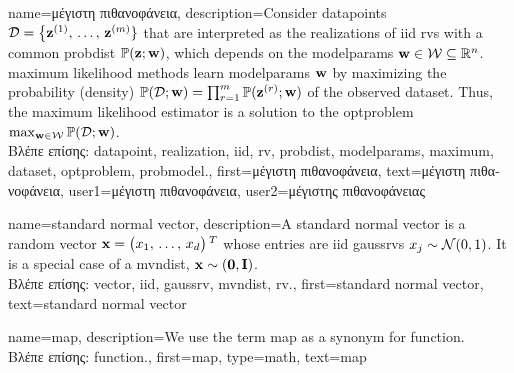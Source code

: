 {name={\foreignlanguage{greek}{μέγιστη πιθανοφάνεια}}, 
	description={Consider \gls{datapoint}s $\mathcal{D}=\big\{ {\bf z}^{(1)}, \,\ldots, \,{\bf z}^{(m)} \}$ 
		that are interpreted as the \gls{realization}s of \gls{iid} \gls{rv}s with a common \gls{probdist} $\mathbb{P}({{\bf z}; {\bf w}})$, which 
		depends on the \gls{modelparams} ${\bf w} \in \mathcal{W} \subseteq \mathbb{R}^{n}$. 
		\Gls{maximum} likelihood methods learn \gls{modelparams} ${\bf w}$ by maximizing 
		the probability (density) $\mathbb{P}({\mathcal{D}; {\bf w}}) = \prod_{r=1}^{m} \mathbb{P}({{\bf z}^{(r)}; {\bf w}})$ 
		of the observed \gls{dataset}. Thus, the \gls{maximum} likelihood estimator is a 
		solution to the \gls{optproblem} $\max_{{\bf w} \in \mathcal{W}} \mathbb{P}({\mathcal{D}; {\bf w}})$.\\
		\foreignlanguage{greek}{Βλέπε επίσης:} \gls{datapoint}, \gls{realization}, \gls{iid}, \gls{rv}, \gls{probdist}, \gls{modelparams}, \gls{maximum}, 
		\gls{dataset}, \gls{optproblem}, \gls{probmodel}.},
	first={\foreignlanguage{greek}{μέγιστη πιθανοφάνεια}},
	text={\foreignlanguage{greek}{μέγιστη πιθανοφάνεια}},
	user1={\foreignlanguage{greek}{μέγιστη πιθανοφάνεια}}, %
  	user2={\foreignlanguage{greek}{μέγιστης πιθανοφά\-νει\-ας}} %
}

{name={standard normal vector}, 
	description={A standard normal \gls{vector} is a random \gls{vector} ${\bf x}=\big(x_{1}, \,\ldots, \,x_{d}\big)\,^{T}$ 
		whose entries are \gls{iid} \gls{gaussrv}s $x_{j} \sim \mathcal{N}(0,1)$. 
		It is a special case of a \gls{mvndist}, ${\bf x} \sim \mathcal(\mathbf{0},\mathbf{I})$. \\ 
		\foreignlanguage{greek}{Βλέπε επίσης:} \gls{vector}, \gls{iid}, \gls{gaussrv}, \gls{mvndist}, \gls{rv}.}, 
	first={standard normal vector},
	text={standard normal vector}
}

{name={map},
	description={We use the term map as a synonym for \gls{function}. \\
		\foreignlanguage{greek}{Βλέπε επίσης:} \gls{function}.},
	first={map},
	type=math, 
	text={map}
}

